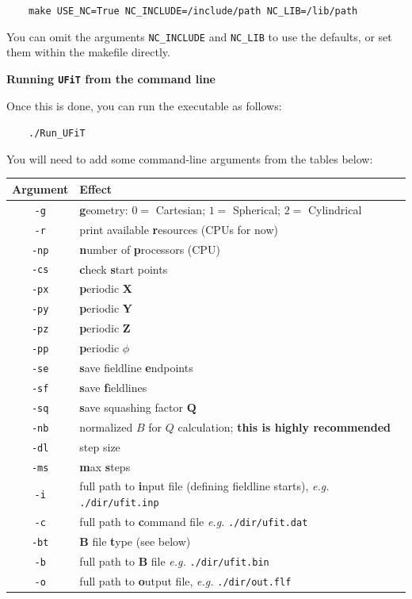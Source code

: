 \documentclass[12pt,twoside]{article}
\begin{document}
$\quad\quad$\texttt{make USE\_NC=True NC\_INCLUDE=/include/path NC\_LIB=/lib/path}

You can omit the arguments \texttt{NC\_INCLUDE} and \texttt{NC\_LIB} to use the defaults, or set them within the makefile directly.


\vspace{2mm}
{\Large \textbf{Running \texttt{UFiT} from the command line}}

Once this is done, you can run the executable as follows: 

$\quad\quad$\texttt{./Run\_UFiT}

You will need to add some command-line arguments from the tables below:

\vspace{2mm}

\begin{tabular}{|c|l|}		
		\hline
		\textbf{Argument} & \textbf{Effect} \\\hline\hline
		\texttt{-g} & \textbf{g}eometry: $0 =$ Cartesian; $1 =$ Spherical; $2 =$ Cylindrical  \\\hline
		\texttt{-r} & print available \textbf{r}esources (CPUs for now) \\\hline
		\texttt{-np} &  \textbf{n}umber of \textbf{p}rocessors (CPU) \\\hline
		\texttt{-cs} & \textbf{c}heck \textbf{s}tart points \\\hline
		\texttt{-px} & \textbf{p}eriodic \textbf{X} \\\hline
		\texttt{-py} & \textbf{p}eriodic \textbf{Y}  \\\hline
		\texttt{-pz} & \textbf{p}eriodic \textbf{Z}  \\\hline
		\texttt{-pp} & \textbf{p}eriodic $\phi$  \\\hline
		\texttt{-se} & \textbf{s}ave fieldline \textbf{e}ndpoints \\\hline
		\texttt{-sf} & \textbf{s}ave \textbf{f}ieldlines \\\hline
		\texttt{-sq} & \textbf{s}ave squashing factor $\mathbf{Q}$  \\\hline
		\texttt{-nb} & normalized $B$ for $Q$ calculation; \textbf{this is highly recommended} \\\hline
		\texttt{-dl} & step size \\\hline
		\texttt{-ms} & \textbf{m}ax \textbf{s}teps  \\\hline
		\texttt{-i} & full path to \textbf{i}nput file (defining fieldline starts), \textit{e.g.} \texttt{./dir/ufit.inp} \\\hline
		\texttt{-c} & full path to \textbf{c}ommand file \textit{e.g.} \texttt{./dir/ufit.dat} \\\hline
		\texttt{-bt} & $\mathbf{B}$ file \textbf{t}ype (see below) \\\hline
		\texttt{-b} & full path to $\mathbf{B}$ file \textit{e.g.} \texttt{./dir/ufit.bin} \\\hline
		\texttt{-o} & full path to \textbf{o}utput file, \textit{e.g.} \texttt{./dir/out.flf} \\\hline

\end{tabular}
\end{document}
